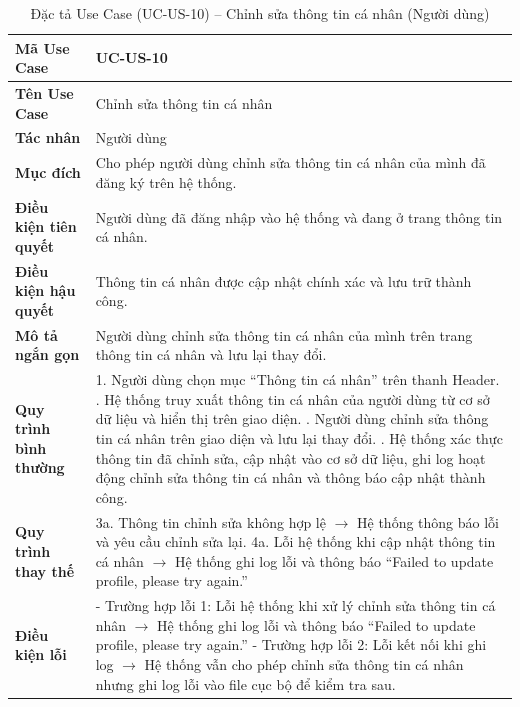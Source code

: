 \renewcommand{\arraystretch}{1.3}
\setlength{\tabcolsep}{4pt}
\begin{longtable}{|p{}|p{}|}
\caption{Đặc tả Use Case (UC-US-10) -- Chỉnh sửa thông tin cá nhân (Người dùng) }\label{tab:uc_edit_profile_user}\\
\hline
\textbf{Mã Use Case} & UC-US-10 \\ \hline
\textbf{Tên Use Case} & Chỉnh sửa thông tin cá nhân \\ \hline
\textbf{Tác nhân} & Người dùng \\ \hline
\textbf{Mục đích} & Cho phép người dùng chỉnh sửa thông tin cá nhân của mình đã đăng ký trên hệ thống. \\ \hline
\textbf{Điều kiện tiên quyết} & Người dùng đã đăng nhập vào hệ thống và đang ở trang thông tin cá nhân. \\ \hline
\textbf{Điều kiện hậu quyết} & Thông tin cá nhân được cập nhật chính xác và lưu trữ thành công. \\ \hline
\textbf{Mô tả ngắn gọn} & Người dùng chỉnh sửa thông tin cá nhân của mình trên trang thông tin cá nhân và lưu lại thay đổi. \\ \hline
\textbf{Quy trình bình thường} &
1. Người dùng chọn mục “Thông tin cá nhân” trên thanh Header. \newline
2. Hệ thống truy xuất thông tin cá nhân của người dùng từ cơ sở dữ liệu và hiển thị trên giao diện. \newline
3. Người dùng chỉnh sửa thông tin cá nhân trên giao diện và lưu lại thay đổi. \newline
4. Hệ thống xác thực thông tin đã chỉnh sửa, cập nhật vào cơ sở dữ liệu, ghi log hoạt động chỉnh sửa thông tin cá nhân và thông báo cập nhật thành công. \\ \hline
\textbf{Quy trình thay thế} &   
3a. Thông tin chỉnh sửa không hợp lệ $\rightarrow$ Hệ thống thông báo lỗi và yêu cầu chỉnh sửa lại. \newline
4a. Lỗi hệ thống khi cập nhật thông tin cá nhân $\rightarrow$ Hệ thống ghi log lỗi và thông báo “Failed to update profile, please try again.” \\ \hline
\textbf{Điều kiện lỗi} &
- Trường hợp lỗi 1: Lỗi hệ thống khi xử lý chỉnh sửa thông tin cá nhân $\rightarrow$ Hệ thống ghi log lỗi và thông báo “Failed to update profile, please try again.” \newline
- Trường hợp lỗi 2: Lỗi kết nối khi ghi log $\rightarrow$ Hệ thống vẫn cho phép chỉnh sửa thông tin cá nhân nhưng ghi log lỗi vào file cục bộ để kiểm tra sau. \\ \hline
\end{longtable}

